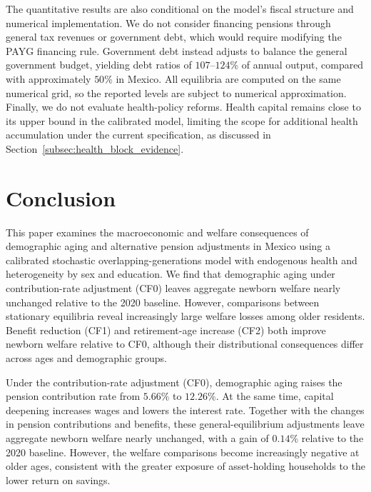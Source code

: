 \documentclass[12pt,a4paper]{article}
\begin{document}
The quantitative results are also conditional on the model's fiscal structure and numerical implementation. We do not consider financing pensions through general tax revenues or government debt, which would require modifying the PAYG financing rule. Government debt instead adjusts to balance the general government budget, yielding debt ratios of $107$--$124\%$ of annual output, compared with approximately $50\%$ in Mexico. All equilibria are computed on the same numerical grid, so the reported levels are subject to numerical approximation. Finally, we do not evaluate health-policy reforms. Health capital remains close to its upper bound in the calibrated model, limiting the scope for additional health accumulation under the current specification, as discussed in Section~\ref{subsec:health_block_evidence}.





\section{Conclusion}
\label{sec:conclusion}

This paper examines the macroeconomic and welfare consequences of demographic aging and alternative pension adjustments in Mexico using a calibrated stochastic overlapping-generations model with endogenous health and heterogeneity by sex and education. We find that demographic aging under contribution-rate adjustment (CF0) leaves aggregate newborn welfare nearly unchanged relative to the 2020 baseline. However, comparisons between stationary equilibria reveal increasingly large welfare losses among older residents. Benefit reduction (CF1) and retirement-age increase (CF2) both improve newborn welfare relative to CF0, although their distributional consequences differ across ages and demographic groups.

Under the contribution-rate adjustment (CF0), demographic aging raises the pension contribution rate from $5.66\%$ to $12.26\%$. At the same time, capital deepening increases wages and lowers the interest rate. Together with the changes in pension contributions and benefits, these general-equilibrium adjustments leave aggregate newborn welfare nearly unchanged, with a gain of $0.14\%$ relative to the 2020 baseline. However, the welfare comparisons become increasingly negative at older ages, consistent with the greater exposure of asset-holding households to the lower return on savings.
\end{document}
